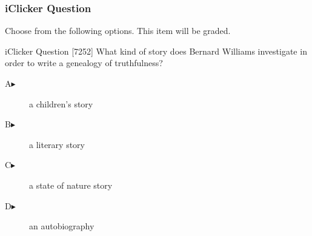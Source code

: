 \begin{frame}
  \frametitle{iClicker Question}
Choose from the following options. This item will be graded.
\begin{block}{iClicker Question}
[7252] What kind of story does Bernard Williams investigate in order to write a genealogy of truthfulness?
\end{block}
\begin{description}
\item[A\hspace{.2in}$\blacktriangleright$] a children's story
\item[B\hspace{.2in}$\blacktriangleright$] a literary story
\item[C\hspace{.2in}$\blacktriangleright$] a state of nature story
\item[D\hspace{.2in}$\blacktriangleright$] an autobiography
\end{description}
\end{frame}